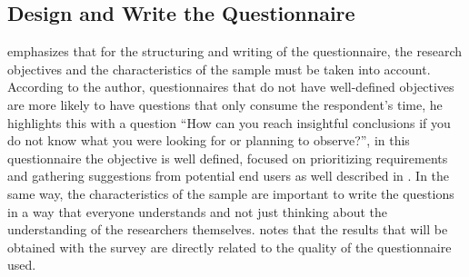 \subsection{Design and Write the Questionnaire} \label{sec:survey-questionnaire}




\textcite{kasunic2005designing} emphasizes that for the structuring and writing of the questionnaire, the research objectives and the characteristics of the sample must be taken into account.
According to the author, questionnaires that do not have well-defined objectives are more likely to have questions that only consume the respondent's time, he highlights this with a question \textcite[p.34]{kasunic2005designing} ``How can you reach insightful conclusions if you do not know what you were looking for or planning to observe?'', in this questionnaire the objective is well defined, focused on prioritizing requirements and gathering suggestions from potential end users as well described in .
In the same way, the characteristics of the sample are important to write the questions in a way that everyone understands and not just thinking about the understanding of the researchers themselves.
\textcite{surveyGuidelines} notes that the results that will be obtained with the survey are directly related to the quality of the questionnaire used.

